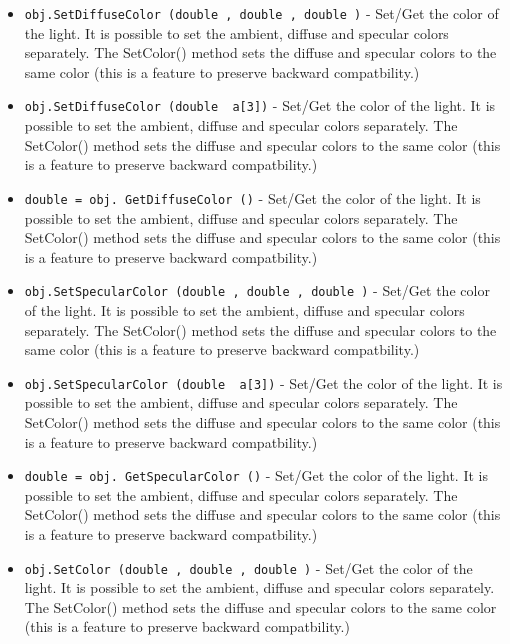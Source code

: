 \begin{itemize}
\item  \verb|obj.SetDiffuseColor (double , double , double )| -  Set/Get the color of the light. It is possible to set the ambient,
 diffuse and specular colors separately. The SetColor() method sets
 the diffuse and specular colors to the same color (this is a feature
 to preserve backward compatbility.)

\item  \verb|obj.SetDiffuseColor (double  a[3])| -  Set/Get the color of the light. It is possible to set the ambient,
 diffuse and specular colors separately. The SetColor() method sets
 the diffuse and specular colors to the same color (this is a feature
 to preserve backward compatbility.)

\item  \verb|double = obj. GetDiffuseColor ()| -  Set/Get the color of the light. It is possible to set the ambient,
 diffuse and specular colors separately. The SetColor() method sets
 the diffuse and specular colors to the same color (this is a feature
 to preserve backward compatbility.)

\item  \verb|obj.SetSpecularColor (double , double , double )| -  Set/Get the color of the light. It is possible to set the ambient,
 diffuse and specular colors separately. The SetColor() method sets
 the diffuse and specular colors to the same color (this is a feature
 to preserve backward compatbility.)

\item  \verb|obj.SetSpecularColor (double  a[3])| -  Set/Get the color of the light. It is possible to set the ambient,
 diffuse and specular colors separately. The SetColor() method sets
 the diffuse and specular colors to the same color (this is a feature
 to preserve backward compatbility.)

\item  \verb|double = obj. GetSpecularColor ()| -  Set/Get the color of the light. It is possible to set the ambient,
 diffuse and specular colors separately. The SetColor() method sets
 the diffuse and specular colors to the same color (this is a feature
 to preserve backward compatbility.)

\item  \verb|obj.SetColor (double , double , double )| -  Set/Get the color of the light. It is possible to set the ambient,
 diffuse and specular colors separately. The SetColor() method sets
 the diffuse and specular colors to the same color (this is a feature
 to preserve backward compatbility.)


\end{itemize}
